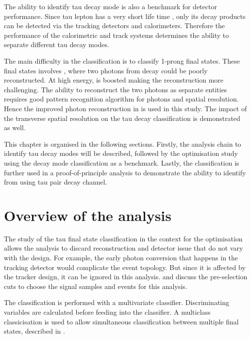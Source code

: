 The ability to identify tau decay mode is also a benchmark for detector performance. Since tau lepton has a very short life time \cite{Abreu:1991jn}, only its decay products can be detected via the tracking detectors and calorimeters. Therefore the performance of the calorimetric and track systems determines the ability to separate different tau decay modes.


The main difficulty in the classification is to classify 1-prong final states.  These final states involves \Ppizero, where two photons from \Ppizero decay could be poorly reconstructed. At high energy, \Ppizero is boosted making the reconstruction more challenging. The ability to reconstruct the two photons as separate entities requires good pattern recognition algorithm for photons and \ECAL spatial resolution. Hence the improved photon reconstruction in  is used in this study. The impact of the \ECAL transverse spatial resolution on the tau decay classification is demonstrated as well.


This chapter is organised in the following sections. Firstly, the analysis chain to identify tau decay modes will be described, followed by the \ECAL optimisation study using the decay mode classification as a benchmark. Lastly, the classification is further used in a proof-of-principle analysis to demonstrate the ability to identify \PHiggs from \PZ using  tau pair decay channel.

\section{Overview of the analysis}

The study of the tau final state classification in the context for the  \ECAL optimisation allows the analysis to discard reconstruction and detector issue that do not vary with the \ECAL design. For example, the early photon conversion that happens in the tracking detector would complicate the event topology. But since it is affected by the tracker design, it can be ignored in this analysis.   and  discuss the pre-selection cuts to choose the signal samples and events for this analysis.

The classification is performed with a multivariate classifier. Discriminating variables are calculated before feeding into the classifier.  A multiclass classicisation is used to allow simultaneous classification between  multiple final states, described in \Section{}.

